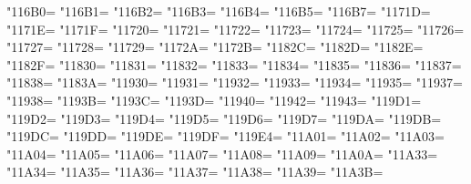 \XeTeXcharclass"116B0=\KclassCM
\XeTeXcharclass"116B1=\KclassCM
\XeTeXcharclass"116B2=\KclassCM
\XeTeXcharclass"116B3=\KclassCM
\XeTeXcharclass"116B4=\KclassCM
\XeTeXcharclass"116B5=\KclassCM
\XeTeXcharclass"116B7=\KclassCM
\XeTeXcharclass"1171D=\KclassCM
\XeTeXcharclass"1171E=\KclassCM
\XeTeXcharclass"1171F=\KclassCM
\XeTeXcharclass"11720=\KclassCM
\XeTeXcharclass"11721=\KclassCM
\XeTeXcharclass"11722=\KclassCM
\XeTeXcharclass"11723=\KclassCM
\XeTeXcharclass"11724=\KclassCM
\XeTeXcharclass"11725=\KclassCM
\XeTeXcharclass"11726=\KclassCM
\XeTeXcharclass"11727=\KclassCM
\XeTeXcharclass"11728=\KclassCM
\XeTeXcharclass"11729=\KclassCM
\XeTeXcharclass"1172A=\KclassCM
\XeTeXcharclass"1172B=\KclassCM
\XeTeXcharclass"1182C=\KclassCM
\XeTeXcharclass"1182D=\KclassCM
\XeTeXcharclass"1182E=\KclassCM
\XeTeXcharclass"1182F=\KclassCM
\XeTeXcharclass"11830=\KclassCM
\XeTeXcharclass"11831=\KclassCM
\XeTeXcharclass"11832=\KclassCM
\XeTeXcharclass"11833=\KclassCM
\XeTeXcharclass"11834=\KclassCM
\XeTeXcharclass"11835=\KclassCM
\XeTeXcharclass"11836=\KclassCM
\XeTeXcharclass"11837=\KclassCM
\XeTeXcharclass"11838=\KclassCM
\XeTeXcharclass"1183A=\KclassCM
\XeTeXcharclass"11930=\KclassCM
\XeTeXcharclass"11931=\KclassCM
\XeTeXcharclass"11932=\KclassCM
\XeTeXcharclass"11933=\KclassCM
\XeTeXcharclass"11934=\KclassCM
\XeTeXcharclass"11935=\KclassCM
\XeTeXcharclass"11937=\KclassCM
\XeTeXcharclass"11938=\KclassCM
\XeTeXcharclass"1193B=\KclassCM
\XeTeXcharclass"1193C=\KclassCM
\XeTeXcharclass"1193D=\KclassCM
\XeTeXcharclass"11940=\KclassCM
\XeTeXcharclass"11942=\KclassCM
\XeTeXcharclass"11943=\KclassCM
\XeTeXcharclass"119D1=\KclassCM
\XeTeXcharclass"119D2=\KclassCM
\XeTeXcharclass"119D3=\KclassCM
\XeTeXcharclass"119D4=\KclassCM
\XeTeXcharclass"119D5=\KclassCM
\XeTeXcharclass"119D6=\KclassCM
\XeTeXcharclass"119D7=\KclassCM
\XeTeXcharclass"119DA=\KclassCM
\XeTeXcharclass"119DB=\KclassCM
\XeTeXcharclass"119DC=\KclassCM
\XeTeXcharclass"119DD=\KclassCM
\XeTeXcharclass"119DE=\KclassCM
\XeTeXcharclass"119DF=\KclassCM
\XeTeXcharclass"119E4=\KclassCM
\XeTeXcharclass"11A01=\KclassCM
\XeTeXcharclass"11A02=\KclassCM
\XeTeXcharclass"11A03=\KclassCM
\XeTeXcharclass"11A04=\KclassCM
\XeTeXcharclass"11A05=\KclassCM
\XeTeXcharclass"11A06=\KclassCM
\XeTeXcharclass"11A07=\KclassCM
\XeTeXcharclass"11A08=\KclassCM
\XeTeXcharclass"11A09=\KclassCM
\XeTeXcharclass"11A0A=\KclassCM
\XeTeXcharclass"11A33=\KclassCM
\XeTeXcharclass"11A34=\KclassCM
\XeTeXcharclass"11A35=\KclassCM
\XeTeXcharclass"11A36=\KclassCM
\XeTeXcharclass"11A37=\KclassCM
\XeTeXcharclass"11A38=\KclassCM
\XeTeXcharclass"11A39=\KclassCM
\XeTeXcharclass"11A3B=\KclassCM
